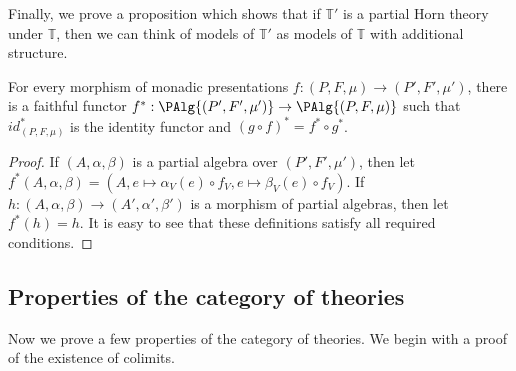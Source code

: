 Finally, we prove a proposition which shows that if $\mathbb{T}'$ is a partial Horn theory under $\mathbb{T}$,
    then we can think of models of $\mathbb{T}'$ as models of $\mathbb{T}$ with additional structure.

\begin{prop}
For every morphism of monadic presentations $f : (P,F,\mu) \to (P',F',\mu')$, there is a faithful functor $f^* : \PAlg{(P',F',\mu')} \to \PAlg{(P,F,\mu)}$
    such that $id_{(P,F,\mu)}^*$ is the identity functor and $(g \circ f)^* = f^* \circ g^*$.
\end{prop}
\begin{proof}
If $(A,\alpha,\beta)$ is a partial algebra over $(P',F',\mu')$, then let $f^*(A,\alpha,\beta) = (A, e \mapsto \alpha_V(e) \circ f_V, e \mapsto \beta_V(e) \circ f_V)$.
If $h : (A,\alpha,\beta) \to (A',\alpha',\beta')$ is a morphism of partial algebras, then let $f^*(h) = h$.
It is easy to see that these definitions satisfy all required conditions.
\end{proof}

\subsection{Properties of the category of theories}
\label{sec:prop}

Now we prove a few properties of the category of theories.
We begin with a proof of the existence of colimits.

